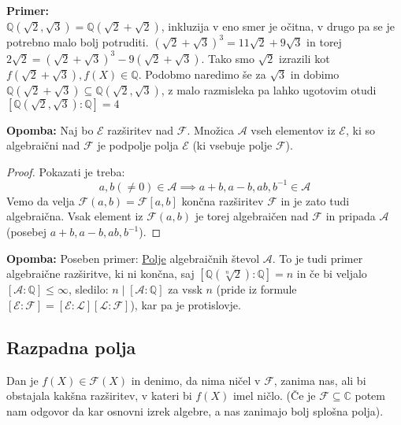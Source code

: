 \documentclass[a4paper]{article}
\newcounter{environment:definition_counter}
\newcounter{environment:theorem_counter}
\newcounter{environment:statement_counter}
\newcounter{example:example_counter}
\newenvironment{example}
{\textbf{Primer:}\\}
{\setcounter{example:example_counter}{0}}
\newenvironment{remark}
{\textbf{Opomba:}}
{}
\begin{document}
\begin{example}
$\mathbb{Q}(\sqrt{2}, \sqrt{3}) =  \mathbb{Q}(\sqrt{2} + \sqrt{2})$, inkluzija v eno smer je očitna, v drugo pa se je potrebno malo bolj potruditi. $(\sqrt{2} + \sqrt{3})^3 = 11\sqrt{2} + 9\sqrt{3}$ in torej $2\sqrt{2} = (\sqrt{2} + \sqrt{3})^3 - 9(\sqrt{2} + \sqrt{3})$. Tako smo $\sqrt{2}$ izrazili kot $f(\sqrt{2} + \sqrt{3}), f(X) \in \mathbb{Q}$. Podobmo naredimo še za $\sqrt{3}$ in dobimo $\mathbb{Q}(\sqrt{2} + \sqrt{3}) \subseteq \mathbb{Q}(\sqrt{2}, \sqrt{3})$, z malo razmisleka pa lahko ugotovim otudi $[\mathbb{Q}(\sqrt{2},\sqrt{3}):\mathbb{Q}] = 4$ 
\end{example}

\begin{remark}
Naj bo $\mathcal{E}$ razširitev nad $\mathcal{F}$. Množica $\mathcal{A}$ vseh elementov iz $\mathcal{E}$, ki so algebraični nad $\mathcal{F}$ je podpolje polja $\mathcal{E}$ (ki vsebuje polje $\mathcal{F}$).
\end{remark}

\begin{proof}
Pokazati je treba:
$$a,b(\neq 0)  \in \mathcal{A} \implies a+b, a-b, ab, b^{-1} \in \mathcal{A}$$
Vemo da velja $\mathcal{F}(a,b) = \mathcal{F}[a,b]$ končna razširitev $\mathcal{F}$ in je zato tudi algebraična. Vsak element iz $\mathcal{F}(a,b)$ je torej algebraičen nad $\mathcal{F}$ in pripada $\mathcal{A}$(posebej $a+b, a-b, ab, b^{-1}$).
\end{proof}

\begin{remark}
Poseben primer: \underline{Polje} algebraičnih števol $\mathcal{A}$. To je tudi primer algebraične razširitve, ki ni končna, saj $[\mathbb{Q}(\sqrt[n]{2}):\mathbb{Q}] = n$ in če bi veljalo $[\mathcal{A}:\mathbb{Q}] \leq \infty$, sledilo: $n \mid [\mathcal{A}:\mathbb{Q}]$ za vssk $n$ (pride iz formule $[\mathcal{E}:\mathcal{F}] = [\mathcal{E}:\mathcal{L}][\mathcal{L}:\mathcal{F}]$), kar pa je protislovje.
\end{remark}

\subsection{Razpadna polja}
Dan je $f(X) \in \mathcal{F}(X)$ in denimo, da nima ničel v $\mathcal{F}$, zanima nas, ali bi obstajala kakšna razširitev, v kateri bi $f(X)$ imel ničlo. (Če je $\mathcal{F} \subseteq \mathbb{C}$ potem nam odgovor da kar osnovni izrek algebre, a nas zanimajo bolj splošna polja).
\end{document}
